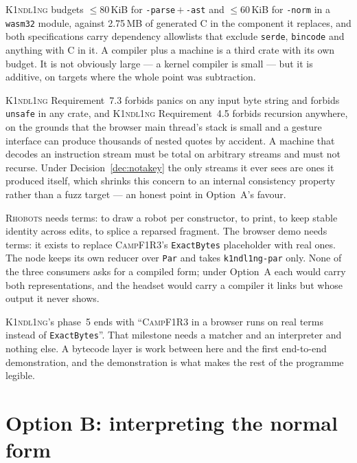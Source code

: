 \documentclass[11pt,a4paper]{article}
\newcommand{\code}[1]{\texttt{#1}}
\newcommand{\Kind}{\textsc{K1ndl1ng}}
\newcommand{\Camp}{\textsc{CampF1R3}}
\newcommand{\Rhobots}{\textsc{Rhobots}}
\theoremstyle{definition}
\theoremstyle{plain}
\begin{document}
\begin{description}[leftmargin=1.8em,style=nextline]
\item[Code size and dependencies (C5).] \Kind{} budgets $\le 80$\,KiB for
\code{-parse}\,$+$\,\code{-ast} and $\le 60$\,KiB for \code{-norm} in a
\code{wasm32} module, against 2.75\,MB of generated C in the component it
replaces, and both specifications carry dependency allowlists that exclude
\code{serde}, \code{bincode} and anything with C in it. A compiler plus a
machine is a third crate with its own budget. It is not obviously large --- a
kernel compiler is small --- but it is additive, on targets where the whole
point was subtraction.
\item[Totality (C5).] \Kind{} Requirement~7.3 forbids panics on any input byte
string and forbids \code{unsafe} in any crate, and \Kind{} Requirement~4.5
forbids recursion anywhere, on the grounds that the browser main thread's stack
is small and a gesture interface can produce thousands of nested quotes by
accident. A machine that decodes an instruction stream must be total on
arbitrary streams and must not recurse. Under Decision~\ref{dec:notakey} the
only streams it ever sees are ones it produced itself, which shrinks this
concern to an internal consistency property rather than a fuzz target --- an
honest point in Option~A's favour.
\item[Consumers (C6).] \Rhobots{} needs terms: to draw a robot per constructor,
to print, to keep stable identity across edits, to splice a reparsed fragment.
The browser demo needs terms: it exists to replace \Camp's \code{ExactBytes}
placeholder with real ones. The node keeps its own reducer over \code{Par} and
takes \code{k1ndl1ng-par} only. None of the three consumers asks for a compiled
form; under Option~A each would carry both representations, and the headset
would carry a compiler it links but whose output it never shows.
\item[Delivery (C7).] \Kind's phase~5 ends with ``\Camp{} in a browser runs on
real terms instead of \code{ExactBytes}''. That milestone needs a matcher and an
interpreter and nothing else. A bytecode layer is work between here and the
first end-to-end demonstration, and the demonstration is what makes the rest of
the programme legible.
\end{description}
\section{Option B: interpreting the normal form}\label{sec:B}
\end{document}
